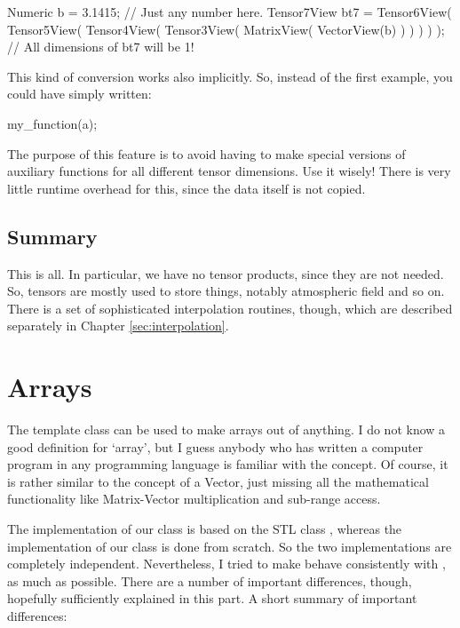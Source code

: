 \begin{code}
Numeric b = 3.1415;             // Just any number here.
Tensor7View bt7 =
  Tensor6View(
     Tensor5View(
        Tensor4View(
           Tensor3View(
              MatrixView(
                 VectorView(b)
              )
           )
        )
     )
  );                 // All dimensions of bt7 will be 1!
\end{code}

This kind of conversion works also implicitly. So, instead of the
first example, you could have simply written:
\begin{code}
my_function(a);
\end{code}

The purpose of this feature is to avoid having to make special
versions of auxiliary functions for all different tensor
dimensions. Use it wisely! There is very little runtime overhead for
this, since the data itself is not copied.

\subsection{Summary}

This is all. In particular, we have no tensor products, since they
are not needed. So, tensors are mostly used to store things, notably
atmospheric field and so on.  There is a set of sophisticated
interpolation routines, though, which are described separately in
Chapter \ref{sec:interpolation}.


\section{Arrays}
\label{sec:matpack:arrays}

The template class  can be used to make arrays out of
anything. I do not know a good definition for `array', but I guess
anybody who has written a computer program in any programming language
is familiar with the concept. Of course, it is rather similar to the
concept of a Vector, just missing all the mathematical functionality
like Matrix-Vector multiplication and sub-range access.

The implementation of our  class is based on the STL class
, whereas the implementation of our 
class is done from scratch. So the two implementations are completely
independent. Nevertheless, I tried to make  behave
consistently with , as much as possible. There are a number
of important differences, though, hopefully sufficiently explained in
this part. A short summary of important differences:

